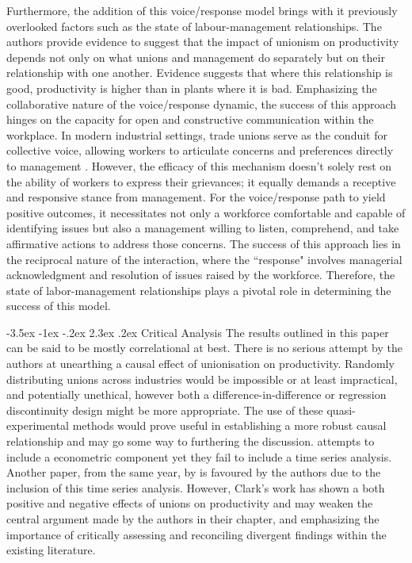 \documentclass[11pt]{article}
\makeatletter
\newcommand{\bb}{\bigbreak\noindent}
\renewcommand\section{\leftskip 0pt\@startsection {section}{1}{\z@}%
	{-3.5ex \@plus -1ex \@minus -.2ex}%
	{2.3ex \@plus.2ex}%
	{\normalfont\Large\bfseries}}
\makeatother
\begin{document}
\begin{spacing}{1.7}
	\bb\bb
	Furthermore, the addition of this voice/response model brings with it previously overlooked factors such as the state of labour-management relationships. The authors provide evidence to suggest that the impact of unionism on productivity depends not only on what unions and management do separately but on their relationship with one another. Evidence suggests that where this relationship is good, productivity is higher than in plants where it is bad. Emphasizing the collaborative nature of the voice/response dynamic, the success of this approach hinges on the capacity for open and constructive communication within the workplace. In modern industrial settings, trade unions serve as the conduit for collective voice, allowing workers to articulate concerns and preferences directly to management \parencite{freeman1979two}. However, the efficacy of this mechanism doesn't solely rest on the ability of workers to express their grievances; it equally demands a receptive and responsive stance from management. For the voice/response path to yield positive outcomes, it necessitates not only a workforce comfortable and capable of identifying issues but also a management willing to listen, comprehend, and take affirmative actions to address those concerns. The success of this approach lies in the reciprocal nature of the interaction, where the ``response" involves managerial acknowledgment and resolution of issues raised by the workforce. Therefore, the state of labor-management relationships plays a pivotal role in determining the success of this model.
	
	\section{Critical Analysis}
	The results outlined in this paper can be said to be mostly correlational at best. There is no serious attempt by the authors at unearthing a causal effect of unionisation on productivity. Randomly distributing unions across industries would be impossible or at least impractical, and potentially unethical, however both a difference-in-difference or regression discontinuity design might be more appropriate. The use of these quasi-experimental methods would prove useful in establishing a more robust causal relationship and may go some way to furthering the discussion. \cite{freeman1980unionism} attempts to include a econometric component yet they fail to include a time series analysis. Another paper, from the same year, by \cite{clark1980impact} is favoured by the authors due to the inclusion of this time series analysis. However, Clark's work has shown a both positive and negative effects of unions on productivity and may weaken the central argument made by the authors in their chapter, and emphasizing the importance of critically assessing and reconciling divergent findings within the existing literature.
	 

\end{spacing}
\end{document}
